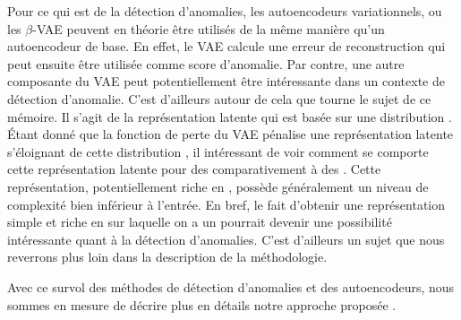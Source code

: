Pour ce qui est de la détection d'anomalies, les autoencodeurs variationnels, ou les $\beta$-VAE \DIFdelbegin \DIFdel{, }\DIFdelend peuvent en théorie être utilisés de la même manière qu'un autoencodeur de base. En effet, le VAE calcule une erreur de reconstruction qui peut ensuite être utilisée comme score d'anomalie. Par contre, une autre composante du VAE peut potentiellement être intéressante dans un contexte de détection d'anomalie. C'est d'ailleurs autour de cela que tourne le sujet de ce mémoire. Il s'agit de la représentation latente qui est basée sur une distribution \DIFdelbegin {}\DIFdelend \DIFaddbegin \textit{}\DIFaddend . Étant donné que la fonction de perte du VAE pénalise une représentation latente s'éloignant de cette distribution \DIFdelbegin {}\DIFdelend \DIFaddbegin \textit{}\DIFaddend , il intéressant de voir comment se comporte cette représentation latente pour des \DIFdelbegin {}\DIFdelend \DIFaddbegin {}\DIFaddend comparativement à des \DIFdelbegin {}\DIFdelend \DIFaddbegin {}\DIFaddend . Cette représentation, potentiellement riche en \DIFdelbegin {}\DIFdelend \DIFaddbegin {}\DIFaddend , possède généralement un niveau de complexité bien inférieur à l'entrée. En bref, le fait d'obtenir une représentation simple et riche en \DIFdelbegin {}\DIFdelend \DIFaddbegin {}\DIFaddend sur laquelle on a un \DIFdelbegin {}\DIFdelend \DIFaddbegin \textit{} \DIFaddend pourrait devenir une possibilité intéressante quant à la détection d'anomalies. C'est d'ailleurs un sujet que nous reverrons plus loin dans la description de la méthodologie.

Avec ce survol des méthodes de détection d'anomalies et des autoencodeurs, nous sommes en mesure de décrire plus en détails notre approche proposée \DIFaddbegin {}\DIFaddend .
